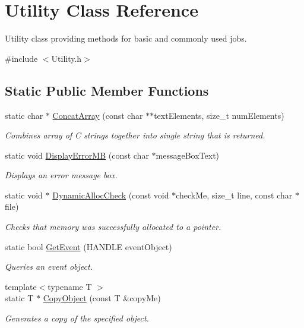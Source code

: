 \hypertarget{class_utility}{
\section{Utility Class Reference}
\label{class_utility}
}


Utility class providing methods for basic and commonly used jobs.  




{\ttfamily \#include $<$Utility.h$>$}

\subsection*{Static Public Member Functions}
\begin{DoxyCompactItemize}
\item 
static char $\ast$ \hyperlink{class_utility_af04a93ab9f0f9a93d9adfdef147466c8}{ConcatArray} (const char $\ast$$\ast$textElements, size\_\-t numElements)
\begin{DoxyCompactList}\small\item\em Combines array of C strings together into single string that is returned. \item\end{DoxyCompactList}\item 
static void \hyperlink{class_utility_a93db37e7f7dfd02de3a5d130602541e5}{DisplayErrorMB} (const char $\ast$messageBoxText)
\begin{DoxyCompactList}\small\item\em Displays an error message box. \item\end{DoxyCompactList}\item 
static void $\ast$ \hyperlink{class_utility_ae9b88a37dc2e95519c938e673dd3de2c}{DynamicAllocCheck} (const void $\ast$checkMe, size\_\-t line, const char $\ast$file)
\begin{DoxyCompactList}\small\item\em Checks that memory was successfully allocated to a pointer. \item\end{DoxyCompactList}\item 
static bool \hyperlink{class_utility_ac4fe98e04185450f534e7cb209a7cf09}{GetEvent} (HANDLE eventObject)
\begin{DoxyCompactList}\small\item\em Queries an event object. \item\end{DoxyCompactList}\item 
{\footnotesize template$<$typename T $>$ }\\static T $\ast$ \hyperlink{class_utility_ac636bc9d69afd77043a9afd6ffb570b5}{CopyObject} (const T \&copyMe)
\begin{DoxyCompactList}\small\item\em Generates a copy of the specified object. \item\end{DoxyCompactList}\end{DoxyCompactItemize}
